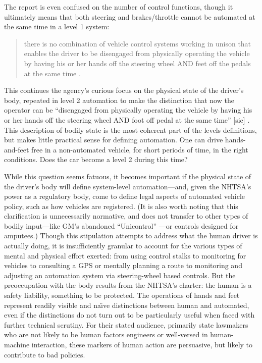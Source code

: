 The report is even confused on the number of control functions, though
it ultimately means that both steering and brakes/throttle cannot be
automated at the same time in a level 1 system: 

\begin{quote}
there is no combination of vehicle control systems working in unison
that enables the driver to be disengaged from physically operating the
vehicle by having his or her hands off the steering wheel AND feet off
the pedals at the same time \cite[p. 4]{NHTSA}.
\end{quote}

This continues the agency's curious focus on the physical state of the
driver's body, repeated in level 2 automation to make the distinction
that now the operator can be ``disengaged from physically operating the
vehicle by having his or her hands off the steering wheel AND foot off
pedal at the same time'' [sic] \cite[p. 5]{NHTSA}. This description of bodily state is
the most coherent part of the levels definitions, but makes little
practical sense for defining automation. One can drive hands-and-feet
free in a non-automated vehicle, for short periods of time, in the
right conditions. Does the car become a level 2 during this time?


While this question seems fatuous, it becomes important if the
physical state of the driver's body will define system-level
automation---and, given the NHTSA's power as a regulatory body, come
to define legal aspects of automated vehicle policy, such as how
vehicles are registered. (It is also worth
noting that this clarification is
unnecessarily normative, and does not transfer to other types of
bodily input---like GM's abandoned ``Unicontrol'' \cite[p. 8]{wetmore}---or controls designed
for amputees.) Though this stipulation attempts to address what the
human driver is actually doing, it is insufficiently granular to
account for the various types of mental and physical effort exerted:
from using control stalks to monitoring for vehicles to consulting a
GPS or mentally planning a route to monitoring and adjusting an
automation system via steering-wheel based controls. But the
preoccupation with the body results from the NHTSA's charter: the
human is a safety liability, something to be protected. The operations
of hands and feet represent readily visible and na\"{\i}ve distinctions
between human and automated, even if the distinctions do not turn out
to be particularly useful when faced with further technical scrutiny.
For their stated audience, primarily state lawmakers who are not
likely to be human factors engineers or well-versed in human-machine
interaction, these markers of human action are persuasive, but likely
to contribute to bad policies.

